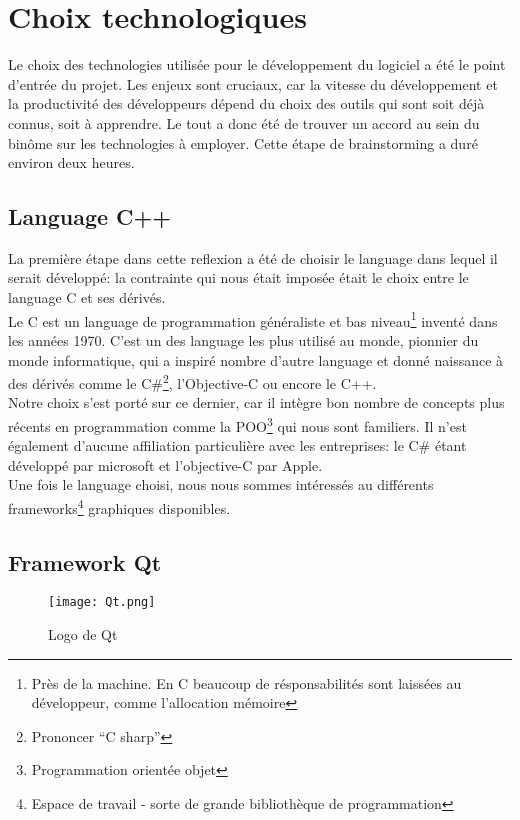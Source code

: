 \chapter{Choix technologiques}
    Le choix des technologies utilisée pour le développement du logiciel a été le point d'entrée du projet. Les enjeux sont cruciaux, car la vitesse du développement et la productivité des développeurs dépend du choix des outils qui sont soit déjà connus, soit à apprendre. Le tout a donc été de trouver un accord au sein du binôme sur les technologies à employer. Cette étape de brainstorming a duré environ deux heures.

    \section{Language C++}
        La première étape dans cette reflexion a été de choisir le language dans lequel il serait développé: la contrainte qui nous était imposée 
        était le choix entre le language C et ses dérivés.
        \\ Le C est un language de programmation généraliste et bas niveau\footnote{Près de la machine. En C beaucoup de résponsabilités sont laissées au développeur, comme l'allocation mémoire} inventé dans les années 1970. C'est un des language les plus utilisé 
        au monde, pionnier du monde informatique, qui a inspiré nombre d'autre language et donné naissance à des dérivés comme le C\#\footnote{Prononcer ``C sharp''}, 
        l'Objective-C ou encore le C++.
        \\ Notre choix s'est porté sur ce dernier, car il intègre bon nombre de concepts plus récents en programmation comme la POO\footnote{Programmation
        orientée objet} qui nous sont familiers. Il n'est également d'aucune affiliation particulière avec les entreprises: le C\# étant développé par microsoft
        et l'objective-C par Apple.
        \\ Une fois le language choisi, nous nous sommes intéressés au différents frameworks\footnote{Espace de travail - sorte de grande bibliothèque 
        de programmation}
        graphiques disponibles.

    \section{Framework Qt}
        \begin{figure}[h]
            \begin{center}
                \texttt{[image: Qt.png]}
            \end{center}

            \caption{Logo de Qt}
            \label{Qt}
        \end{figure}

